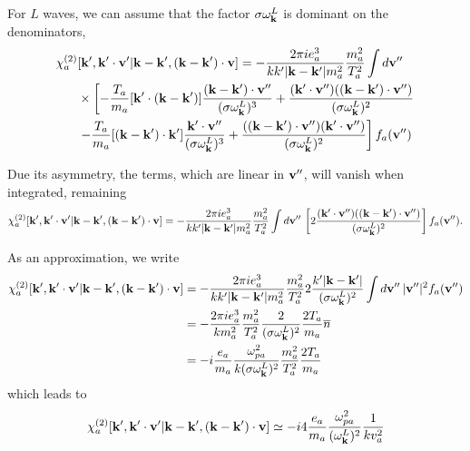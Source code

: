 \documentclass[12pt,a4paper,ruledheader]{report}
\begin{document}
\begin{appendix}
For $L$ waves, we can assume that the factor $\sigma\omega_{\bf k}^L$ is 
dominant on the denominators,
\begin{equation}
  \begin{split}
    \chi_a^{(2)}&[{\bf k'},{\bf k'\cdot v'}|{\bf k-k'},({\bf k-k'})\cdot{\bf v}]
    =-\frac{2\pi ie_a^3}{k k'|{\bf k-k'}|m_a^2}\frac{m_a^2}{T_a^2}\int d{\bf v''}\\
    &\times\left[-\frac{T_a}{m_a}[{\bf k'}\cdot({\bf k-k'})]
      \frac{({\bf k-k'})\cdot{\bf v''}}
      {(\sigma\omega_{\bf k}^L)^3}+ \frac{({\bf k'}\cdot{\bf v''})
        (({\bf k-k'})\cdot{\bf v''})}
      {(\sigma\omega_{\bf k}^L)^2} \right.\\
    &\left. -\frac{T_a}{m_a} [({\bf k-k'})\cdot {\bf k'}]
      \frac{{\bf k'}\cdot{\bf v''}}
      {(\sigma\omega_{\bf k}^L)^3}
      + \frac{(({\bf k-k'})\cdot{\bf v''})
        ({\bf k'}\cdot{\bf v''})}
      {(\sigma\omega_{\bf k}^L)^2}
    \right] f_a({\bf v''})
    \label{dom-freq}
  \end{split}
\end{equation}

Due its asymmetry, the terms, which are linear in ${\bf v''}$, will vanish
when integrated, remaining
\begin{equation}
\begin{split}
\chi_a^{(2)}[{\bf k'},{\bf k'\cdot v'}|{\bf k-k'},({\bf k-k'})\cdot{\bf v}]
=-\frac{2\pi ie_a^3}{k k'|{\bf k-k'}|m_a^2}\frac{m_a^2}{T_a^2}
\int d{\bf v''}\,\left[2\frac{({\bf k'}\cdot{\bf v''})
(({\bf k-k'})\cdot{\bf v''})}
{(\sigma\omega_{\bf k}^L)^2} 
\right] f_a({\bf v''}).
\end{split}
\end{equation}

As an approximation, we write
\begin{equation}
\begin{split}
\chi_a^{(2)}[{\bf k'},{\bf k'\cdot v'}|{\bf k-k'},({\bf k-k'})\cdot{\bf v}]
&=-\frac{2\pi ie_a^3}{k k'|{\bf k-k'}|m_a^2}\frac{m_a^2}{T_a^2}
2\frac{k'|{\bf k-k'}|}{(\sigma\omega_{\bf k}^L)^2} 
\int d{\bf v''}\,|{\bf v''}|^2 f_a({\bf v''})\\
&=-\frac{2\pi ie_a^3}{k m_a^2}\frac{m_a^2}{T_a^2}
\frac{2}{(\sigma\omega_{\bf k}^L)^2} \frac{2T_a}{m_a}\overline{n}\\
&=-i\frac{e_a}{m_a}\frac{\omega_{pa}^2}{k(\sigma\omega_{\bf k}^L)^2} 
\frac{m_a^2}{T_a^2}\frac{2T_a}{m_a}\nonumber
\end{split}
\end{equation}
which leads to
\begin{equation}
\label{chi2,3}
\chi_a^{(2)}[{\bf k'},{\bf k'\cdot v'}|{\bf k-k'},({\bf k-k'})\cdot{\bf v}]
\simeq -i4\frac{e_a}{m_a}\frac{\omega_{pa}^2}{(\omega_{\bf k}^L)^2} 
\frac{1}{kv_{a}^2}
\end{equation}


\end{appendix}
\end{document}
